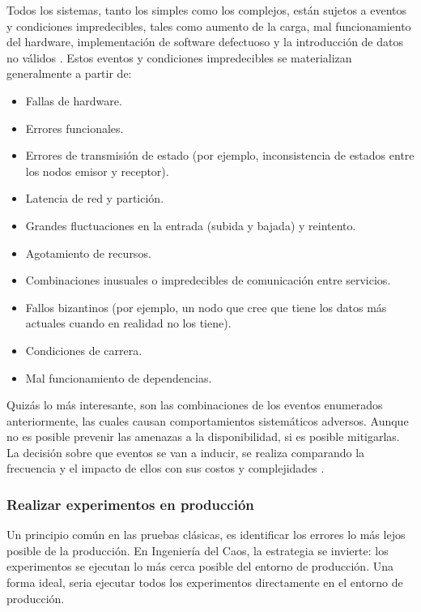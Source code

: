 \par Todos los sistemas, tanto los simples como los complejos, están sujetos a eventos y condiciones impredecibles, tales como aumento de la carga, mal funcionamiento del hardware, implementación de software defectuoso y la introducción de datos no válidos \cite{LIB06}. Estos eventos y condiciones impredecibles se materializan generalmente a partir de:
\begin{itemize}
    \item Fallas de hardware.
    \item Errores funcionales.
    \item Errores de transmisión de estado (por ejemplo, inconsistencia de estados entre los nodos emisor y receptor).
    \item Latencia de red y partición. 
    \item Grandes fluctuaciones en la entrada (subida y bajada) y reintento.
    \item Agotamiento de recursos.
    \item Combinaciones inusuales o impredecibles de comunicación entre servicios.
    \item Fallos bizantinos (por ejemplo, un nodo que cree que tiene los datos más actuales cuando en realidad no los tiene).
    \item Condiciones de carrera.
    \item Mal funcionamiento de dependencias.
\end{itemize}

\par Quizás lo más interesante, son las combinaciones de los eventos enumerados anteriormente, las cuales causan comportamientos sistemáticos adversos. Aunque no es posible prevenir las amenazas a la disponibilidad, si es posible mitigarlas. La decisión sobre que eventos se van a inducir, se realiza comparando la frecuencia y el impacto de ellos con sus costos y complejidades \cite{LIB06}.

\subsubsection{Realizar experimentos en producción}

\par Un principio común en las pruebas clásicas, es identificar los errores lo más lejos posible de la producción. En Ingeniería del Caos, la estrategia se invierte: los experimentos se ejecutan lo más cerca posible del entorno de producción. Una forma ideal, seria ejecutar todos los experimentos directamente en el entorno de producción.\\

